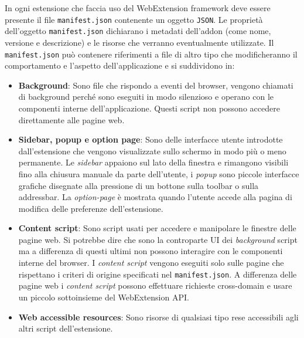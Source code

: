 \documentclass{sapthesis}
\newcommand{\bold}[1]{\textbf{#1}}
\newcommand{\code}[1]{\texttt{#1}}
\newcommand{\manifest}{\code{manifest.json}}
\begin{document}
        In ogni estensione che faccia uso del WebExtension framework deve essere presente il file \manifest{} contenente 
        un oggetto \code{JSON}. Le proprietà dell'oggetto \manifest{} dichiarano i metadati dell'addon (come nome, 
        versione e descrizione) e le risorse che verranno eventualmente utilizzate.
        Il \manifest{} può contenere riferimenti a file di altro tipo che modificheranno il comportamento e l'aspetto
        dell'applicazione e si suddividono in:
        \begin{itemize}
            \item \bold{Background}: Sono file che rispondo a eventi del browser, vengono chiamati di background 
                    perché sono eseguiti in modo silenzioso e operano con le componenti interne dell'applicazione.
                    Questi script non possono accedere direttamente alle pagine web.

            \item \bold{Sidebar, popup e option page}: Sono delle interfacce utente introdotte dall'estensione che
                    vengono visualizzate sullo schermo in modo più o meno permanente. Le \textit{sidebar} appaiono sul lato
                    della finestra e rimangono visibili fino alla chiusura manuale da parte dell'utente, i \textit{popup} sono
                    piccole interfacce grafiche disegnate alla pressione di un bottone sulla toolbar o sulla addressbar.
                    La \textit{option-page} è mostrata quando l'utente accede alla pagina di modifica delle preferenze
                    dell'estensione.

            \item \bold{Content script}: Sono script usati per accedere e manipolare le finestre delle pagine web. Si
                    potrebbe dire che sono la controparte UI dei \textit{background} script ma a differenza di questi
                    ultimi non possono interagire con le componenti interne del browser. I \textit{content script} 
                    vengono eseguiti solo sulle pagine che rispettano i criteri di origine specificati nel \manifest{}.
                    A differenza delle pagine web i \textit{content script} possono effettuare richieste cross-domain e
                    usare un piccolo sottoinsieme del WebExtension API.

            \item \bold{Web accessible resources}: Sono risorse di qualsiasi tipo rese accessibili agli altri script
                    dell'estensione.

        \end{itemize}
\end{document}
